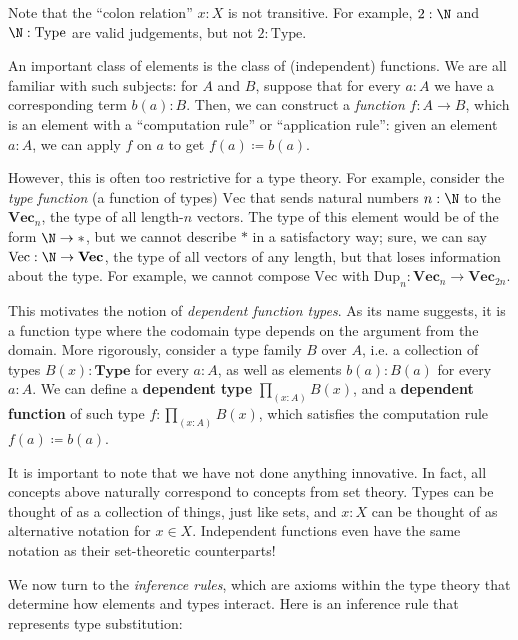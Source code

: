 Note that the ``colon relation'' \(x : X\) is not transitive. For example, \(2 : \N\) and \(\N : \mathrm{Type}\) are valid judgements, but not \(2 : \mathrm{Type}\).


An important class of elements is the class of (independent) functions. We are all familiar with such subjects: for \(A\) and \(B\), suppose that for every \(a : A\) we have a corresponding term \(b(a) : B\). Then, we can construct a \textit{function} \(f : A \to B\), which is an element with a ``computation rule'' or ``application rule'': given an element \(a : A\), we can apply \(f\) on \(a\) to get \(f(a) \coloneqq b(a)\).

However, this is often too restrictive for a type theory. For example, consider the \textit{type function} (a function of types) \(\mathrm{Vec}\) that sends natural numbers \(n : \N\) to the \(\mathbf{Vec}_n\), the type of all length-\(n\) vectors. The type of this element would be of the form \(\N \to *\), but we cannot describe \(*\) in a satisfactory way; sure, we can say \(\mathrm{Vec} : \N \to \mathbf{Vec}\), the type of all vectors of any length, but that loses information about the type. For example, we cannot compose \(\mathrm{Vec}\) with \(\mathrm{Dup}_n : \mathbf{Vec}_n \to \mathbf{Vec}_{2n}\).

This motivates the notion of \textit{dependent function types}. As its name suggests, it is a function type where the codomain type depends on the argument from the domain. More rigorously, consider a type family \(B\) over \(A\), i.e. a collection of types \(B(x) : \mathbf{Type}\) for every \(a : A\), as well as elements \(b(a) : B(a)\) for every \(a : A\). We can define a \textbf{dependent type} \(\prod_{(x : A)} B(x)\), and a \textbf{dependent function} of such type \(f : \prod_{(x : A)} B(x)\), which satisfies the computation rule \(f(a) \coloneqq b(a)\).

It is important to note that we have not done anything innovative. In fact, all concepts above naturally correspond to concepts from set theory. Types can be thought of as a collection of things, just like sets, and \(x : X\) can be thought of as alternative notation for \(x \in X\). Independent functions even have the same notation as their set-theoretic counterparts!

We now turn to the \textit{inference rules}, which are axioms within the type theory that determine how elements and types interact. Here is an inference rule that represents type substitution:

